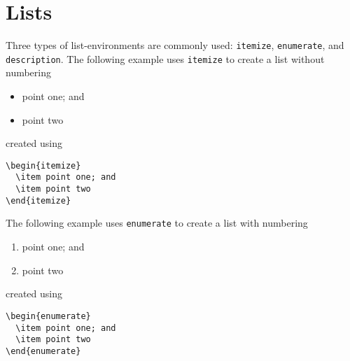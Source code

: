\section{Lists}\label{sec:lists}
Three types of list-environments are commonly used: \texttt{itemize}, \texttt{enumerate}, and \texttt{description}. The following example uses \texttt{itemize} to create a list without numbering
\begin{itemize}
  \item point one; and
  \item point two
\end{itemize}
created using
\begin{verbatim}
\begin{itemize}
  \item point one; and
  \item point two
\end{itemize}
\end{verbatim}

The following example uses \texttt{enumerate} to create a list with numbering
\begin{enumerate}
  \item point one; and
  \item point two
\end{enumerate}
created using
\begin{verbatim}
\begin{enumerate}
  \item point one; and
  \item point two
\end{enumerate}
\end{verbatim}

